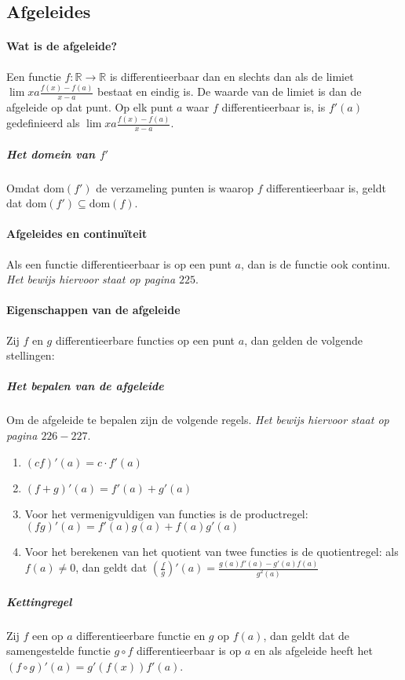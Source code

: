 \subsection{Afgeleides}

\paragraph{Wat is de afgeleide?} Een functie $f:\mathbb{R}\to\mathbb{R}$ is differentieerbaar dan en slechts dan als de limiet $\lim{x}{a}\frac{f(x)-f(a)}{x-a}$ bestaat en eindig is. De waarde van de limiet is dan de afgeleide op dat punt. Op elk punt $a$ waar $f$ differentieerbaar is, is $f'(a)$ gedefinieerd als $\lim{x}{a}\frac{f(x)-f(a)}{x-a}$.

\subparagraph{Het domein van $f'$} Omdat $\text{dom}(f')$ de verzameling punten is waarop $f$ differentieerbaar is, geldt dat $\text{dom}(f')\subseteq\text{dom}(f)$.

\paragraph{Afgeleides en continuïteit} Als een functie differentieerbaar is op een punt $a$, dan is de functie ook continu. \textit{Het bewijs hiervoor staat op pagina $225$}.

\paragraph{Eigenschappen van de afgeleide} Zij $f$ en $g$ differentieerbare functies op een punt $a$, dan gelden de volgende stellingen:

\subparagraph{Het bepalen van de afgeleide} Om de afgeleide te bepalen zijn de volgende regels. \textit{Het bewijs hiervoor staat op pagina $226-227$}.


\begin{enumerate}
  \setlength\itemsep{0em}
  \item $(cf)'(a)=c\cdot f'(a)$
  \item $(f+g)'(a)=f'(a)+g'(a)$
  \item Voor het vermenigvuldigen van functies is de productregel: $(fg)'(a)=f'(a)g(a)+f(a)g'(a)$
  \item Voor het berekenen van het quotient van twee functies is de quotientregel: als $f(a)\neq0$, dan geldt dat $(\frac{f}{g})'(a)=\frac{g(a)f'(a)-g'(a)f(a)}{g^{2}(a)}$
\end{enumerate}

\subparagraph{Kettingregel} Zij $f$ een op $a$ differentieerbare functie en $g$ op $f(a)$, dan geldt dat de samengestelde functie $g\circ f$ differentieerbaar is op $a$ en als afgeleide heeft het $(f\circ g)'(a) = g'(f(x))f'(a)$.
